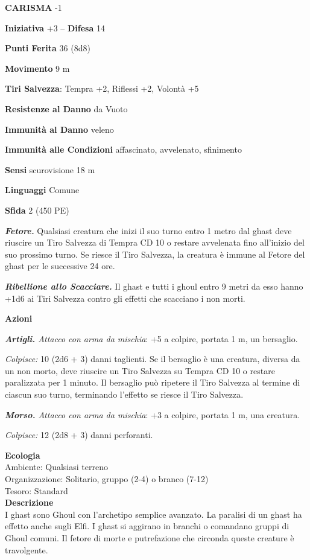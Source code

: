 \begin{multicols}{2}
\textbf{CARISMA} -1

\textbf{Iniziativa} +3 -- \textbf{Difesa} 14

\textbf{Punti Ferita} 36 (8d8)

\textbf{Movimento} 9 m

\textbf{Tiri Salvezza}: Tempra +2, Riflessi +2, Volontà +5

\textbf{Resistenze al Danno} da Vuoto

\textbf{Immunità al Danno} veleno

\textbf{Immunità alle Condizioni} affascinato, avvelenato, sfinimento

\textbf{Sensi} scurovisione 18 m

\textbf{Linguaggi} Comune

\textbf{Sfida} 2 (450 PE)

\emph{\textbf{Fetore.}} Qualsiasi creatura che inizi il suo turno entro 1 metro dal ghast deve riuscire un Tiro Salvezza di Tempra CD 10 o restare avvelenata fino all'inizio del suo prossimo turno. Se riesce il Tiro Salvezza, la creatura è immune al Fetore del ghast per le successive 24
ore.

\emph{\textbf{Ribellione allo Scacciare.}} Il ghast e tutti i ghoul entro 9 metri da esso hanno +1d6 ai Tiri Salvezza contro gli effetti che scacciano i non morti.

\textbf{Azioni}

\emph{\textbf{Artigli.} Attacco con arma da mischia}: +5 a colpire,
portata 1 m, un bersaglio.

\emph{Colpisce:} 10 (2d6 + 3) danni taglienti. Se il bersaglio è una creatura, diversa da un non morto, deve riuscire un Tiro Salvezza su Tempra CD 10 o restare paralizzata per 1 minuto. Il bersaglio può ripetere il Tiro Salvezza al termine di ciascun suo turno, terminando l'effetto se riesce il Tiro Salvezza. 

\emph{\textbf{Morso.} Attacco con arma da mischia}: +3 a colpire, portata 1 m, una creatura.

\emph{Colpisce:} 12 (2d8 + 3) danni perforanti.

\textbf{Ecologia}\\
Ambiente: Qualsiasi terreno\\
Organizzazione: Solitario, gruppo (2-4) o branco (7-12)\\
Tesoro: Standard\\
\textbf{Descrizione}\\
I ghast sono Ghoul con l'archetipo semplice avanzato. La paralisi di un ghast ha effetto anche sugli Elfi. I ghast si aggirano in branchi o comandano gruppi di Ghoul comuni. Il fetore di morte e putrefazione che circonda queste creature è travolgente.\\



\end{multicols}
